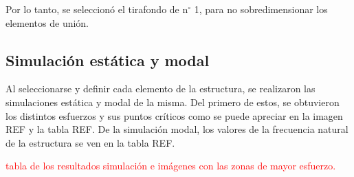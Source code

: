 \begin{table}[h]
\centering
{}
\caption{Esfuerzos admisibles y factor de seguridad para distintas longitudes de tirafondo.}
\label{tab:res_tirafondos}
\end{table}

Por lo tanto, se seleccionó el tirafondo de n$^{\circ}$ 1, para no sobredimensionar los elementos de unión.

\subsection{Simulación estática y modal}

Al seleccionarse y definir cada elemento de la estructura, se realizaron las simulaciones estática y modal de la misma. Del primero de estos, se obtuvieron los distintos esfuerzos y sus puntos críticos como se puede apreciar en la imagen REF y la tabla REF. De la simulación modal, los valores de la frecuencia natural de la estructura se ven en la tabla REF.

\textcolor{red}{tabla de los resultados simulación e imágenes con las zonas de mayor esfuerzo.}

